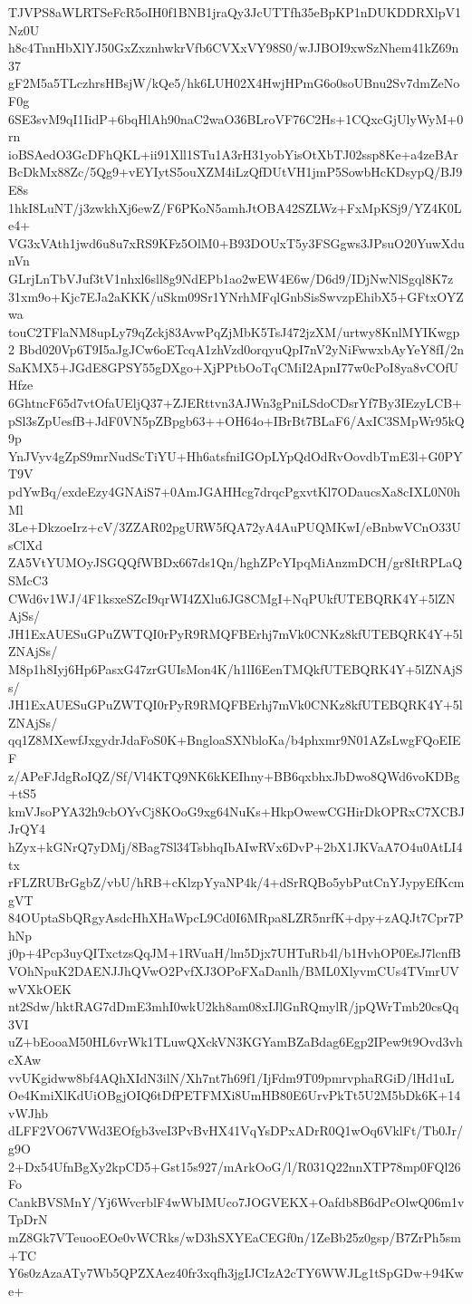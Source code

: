 TJVPS8aWLRTSeFcR5oIH0f1BNB1jraQy3JcUTTfh35eBpKP1nDUKDDRXlpV1Nz0U
h8c4TnnHbXlYJ50GxZxznhwkrVfb6CVXxVY98S0/wJJBOI9xwSzNhem41kZ69n37
gF2M5a5TLczhrsHBsjW/kQe5/hk6LUH02X4HwjHPmG6o0soUBnu2Sv7dmZeNoF0g
6SE3svM9qI1IidP+6bqHlAh90naC2waO36BLroVF76C2Hs+1CQxcGjUlyWyM+0rn
ioBSAedO3GcDFhQKL+ii91Xll1STu1A3rH31yobYisOtXbTJ02ssp8Ke+a4zeBAr
BcDkMx88Zc/5Qg9+vEYIytS5ouXZM4iLzQfDUtVH1jmP5SowbHcKDsypQ/BJ9E8s
1hkI8LuNT/j3zwkhXj6ewZ/F6PKoN5amhJtOBA42SZLWz+FxMpKSj9/YZ4K0Le4+
VG3xVAth1jwd6u8u7xRS9KFz5OlM0+B93DOUxT5y3FSGgws3JPsuO20YuwXdunVn
GLrjLnTbVJuf3tV1nhxl6sll8g9NdEPb1ao2wEW4E6w/D6d9/IDjNwNlSgql8K7z
31xm9o+Kjc7EJa2aKKK/uSkm09Sr1YNrhMFqlGnbSisSwvzpEhibX5+GFtxOYZwa
touC2TFlaNM8upLy79qZckj83AvwPqZjMbK5TsJ472jzXM/urtwy8KnlMYIKwgp2
Bbd020Vp6T9I5aJgJCw6oETcqA1zhVzd0orqyuQpI7nV2yNiFwwxbAyYeY8fI/2n
SaKMX5+JGdE8GPSY55gDXgo+XjPPtbOoTqCMiI2ApnI77w0cPoI8ya8vCOfUHfze
6GhtncF65d7vtOfaUEljQ37+ZJERttvn3AJWn3gPniLSdoCDsrYf7By3IEzyLCB+
pSl3sZpUesfB+JdF0VN5pZBpgb63++OH64o+IBrBt7BLaF6/AxIC3SMpWr95kQ9p
YnJVyv4gZpS9mrNudScTiYU+Hh6atsfniIGOpLYpQdOdRvOovdbTmE3l+G0PYT9V
pdYwBq/exdeEzy4GNAiS7+0AmJGAHHcg7drqcPgxvtKl7ODaucsXa8cIXL0N0hMl
3Le+DkzoeIrz+cV/3ZZAR02pgURW5fQA72yA4AuPUQMKwI/eBnbwVCnO33UsClXd
ZA5VtYUMOyJSGQQfWBDx667ds1Qn/hghZPcYIpqMiAnzmDCH/gr8ItRPLaQSMcC3
CWd6v1WJ/4F1ksxeSZcI9qrWI4ZXlu6JG8CMgI+NqPUkfUTEBQRK4Y+5lZNAjSs/
JH1ExAUESuGPuZWTQI0rPyR9RMQFBErhj7mVk0CNKz8kfUTEBQRK4Y+5lZNAjSs/
M8p1h8Iyj6Hp6PasxG47zrGUIsMon4K/h1lI6EenTMQkfUTEBQRK4Y+5lZNAjSs/
JH1ExAUESuGPuZWTQI0rPyR9RMQFBErhj7mVk0CNKz8kfUTEBQRK4Y+5lZNAjSs/
qq1Z8MXewfJxgydrJdaFoS0K+BngloaSXNbloKa/b4phxmr9N01AZsLwgFQoEIEF
z/APeFJdgRoIQZ/Sf/Vl4KTQ9NK6kKEIhny+BB6qxbhxJbDwo8QWd6voKDBg+tS5
kmVJsoPYA32h9cbOYvCj8KOoG9xg64NuKs+HkpOwewCGHirDkOPRxC7XCBJJrQY4
hZyx+kGNrQ7yDMj/8Bag7Sl34TsbhqIbAIwRVx6DvP+2bX1JKVaA7O4u0AtLI4tx
rFLZRUBrGgbZ/vbU/hRB+cKlzpYyaNP4k/4+dSrRQBo5ybPutCnYJypyEfKcmgVT
84OUptaSbQRgyAsdcHhXHaWpcL9Cd0I6MRpa8LZR5nrfK+dpy+zAQJt7Cpr7PhNp
j0p+4Pcp3uyQITxctzsQqJM+1RVuaH/lm5Djx7UHTuRb4l/b1HvhOP0EsJ7lcnfB
VOhNpuK2DAENJJhQVwO2PvfXJ3OPoFXaDanlh/BML0XlyvmCUs4TVmrUVwVXkOEK
nt2Sdw/hktRAG7dDmE3mhI0wkU2kh8am08xIJlGnRQmylR/jpQWrTmb20csQq3VI
uZ+bEooaM50HL6vrWk1TLuwQXckVN3KGYamBZaBdag6Egp2IPew9t9Ovd3vhcXAw
vvUKgidww8bf4AQhXIdN3ilN/Xh7nt7h69f1/IjFdm9T09pmrvphaRGiD/lHd1uL
Oe4KmiXlKdUiOBgjOIQ6tDfPETFMXi8UmHB80E6UrvPkTt5U2M5bDk6K+14vWJhb
dLFF2VO67VWd3EOfgb3veI3PvBvHX41VqYsDPxADrR0Q1wOq6VklFt/Tb0Jr/g9O
2+Dx54UfnBgXy2kpCD5+Gst15s927/mArkOoG/l/R031Q22nnXTP78mp0FQl26Fo
CankBVSMnY/Yj6WvcrblF4wWbIMUco7JOGVEKX+Oafdb8B6dPcOlwQ06m1vTpDrN
mZ8Gk7VTeuooEOe0vWCRks/wD3hSXYEaCEGf0n/1ZeBb25z0gsp/B7ZrPh5sm+TC
Y6s0zAzaATy7Wb5QPZXAez40fr3xqfh3jgIJCIzA2cTY6WWJLg1tSpGDw+94Kwe+
